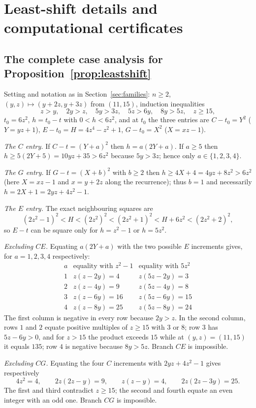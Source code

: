 \section{Least-shift details and computational certificates}\label{app:certificates}

\subsection{The complete case analysis for Proposition~\ref{prop:leastshift}}

Setting and notation as in Section~\ref{sec:families}: $n\ge2$,
$(y,z)\mapsto(y+2z,y+3z)$ from $(11,15)$, induction inequalities
\[
z>y,\quad 2y>z,\quad 5y>3z,\quad 5z>6y,\quad 8y>5z,\quad z\ge15,
\]
$t_0=6z^2$, $h=t_0-t$ with $0<h<6z^2$, and at $t_0$ the three entries are
$C-t_0=Y^2$ ($Y=yz+1$), $E-t_0=H=4z^4-z^2+1$, $G-t_0=X^2$ ($X=xz-1$).

\emph{The $C$ entry.} If $C-t=(Y+a)^2$ then $h=a(2Y+a)$. If $a\ge5$ then
$h\ge5(2Y+5)=10yz+35>6z^2$ because $5y>3z$; hence only $a\in\{1,2,3,4\}$.

\emph{The $G$ entry.} If $G-t=(X+b)^2$ with $b\ge2$ then
$h\ge4X+4=4yz+8z^2>6z^2$ (here $X=xz-1$ and $x=y+2z$ along the
recurrence); thus $b=1$ and necessarily $h=2X+1=2yz+4z^2-1$.

\emph{The $E$ entry.} The exact neighbouring squares are
\[
(2z^2-1)^2<H<(2z^2)^2<(2z^2+1)^2<H+6z^2<(2z^2+2)^2,
\]
so $E-t$ can be square only for $h=z^2-1$ or $h=5z^2$.

\emph{Excluding $CE$.} Equating $a(2Y+a)$ with the two possible $E$
increments gives, for $a=1,2,3,4$ respectively:
\[
\begin{array}{r|c|c}
a & \text{equality with } z^2-1 & \text{equality with } 5z^2\\\hline
1 & z(z-2y)=4 & z(5z-2y)=3\\
2 & z(z-4y)=9 & z(5z-4y)=8\\
3 & z(z-6y)=16 & z(5z-6y)=15\\
4 & z(z-8y)=25 & z(5z-8y)=24
\end{array}
\]
The first column is negative in every row because $2y>z$. In the second
column, rows $1$ and $2$ equate positive multiples of $z\ge15$ with $3$ or
$8$; row $3$ has $5z-6y>0$, and for $z>15$ the product exceeds $15$ while
at $(y,z)=(11,15)$ it equals $135$; row $4$ is negative because $8y>5z$.
Branch $CE$ is impossible.

\emph{Excluding $CG$.} Equating the four $C$ increments with
$2yz+4z^2-1$ gives respectively
\[
4z^2=4,\qquad 2z(2z-y)=9,\qquad z(z-y)=4,\qquad 2z(2z-3y)=25 .
\]
The first and third contradict $z\ge15$; the second and fourth equate an
even integer with an odd one. Branch $CG$ is impossible.

